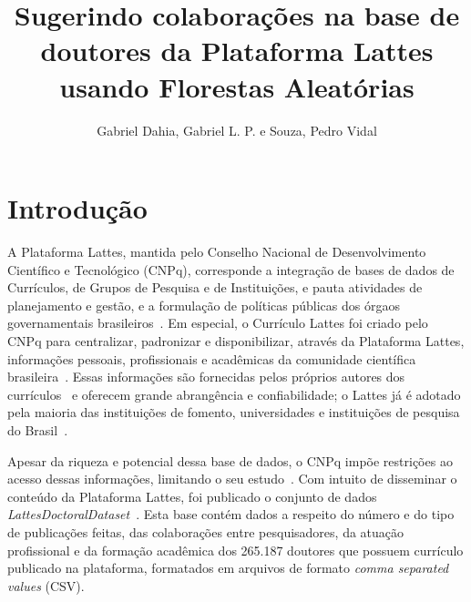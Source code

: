 \documentclass[12pt]{article}
\title{Sugerindo colaborações na base de doutores da Plataforma Lattes usando Florestas Aleatórias}
\author{Gabriel Dahia, Gabriel L. P. e Souza, Pedro Vidal}
\begin{document}
 

\maketitle

     


\section{Introdução}

A Plataforma Lattes, mantida pelo Conselho Nacional de Desenvolvimento Científico e Tecnológico (CNPq), corresponde a integração de bases de dados de Currículos, de Grupos de Pesquisa e de Instituições, e pauta atividades de planejamento e gestão, e a formulação de políticas públicas dos órgaos governamentais brasileiros~\cite{lattes-cnpq}.
Em especial, o Currículo Lattes foi criado pelo CNPq para centralizar, padronizar e disponibilizar, através da Plataforma Lattes, informações pessoais, profissionais e acadêmicas da comunidade científica brasileira~\cite{sucupira}.
Essas informações são fornecidas pelos próprios autores dos currículos~\cite{sucupira} e oferecem grande abrangência e confiabilidade; o Lattes já é adotado pela maioria das instituições de fomento, universidades e instituições de pesquisa do Brasil~\cite{lattes-cnpq}.

Apesar da riqueza e potencial dessa base de dados, o CNPq impõe restrições ao acesso dessas informações, limitando o seu estudo~\cite{lattes-dataset}.
Com intuito de disseminar o conteúdo da Plataforma Lattes, foi publicado o conjunto de dados \emph{LattesDoctoralDataset}~\cite{lattes-dataset}.
Esta base contém dados a respeito do número e do tipo de publicações feitas, das colaborações entre pesquisadores, da atuação profissional e da formação acadêmica dos 265.187 doutores que possuem currículo publicado na plataforma, formatados em arquivos de formato \textit{comma separated values} (CSV).
\end{document}
